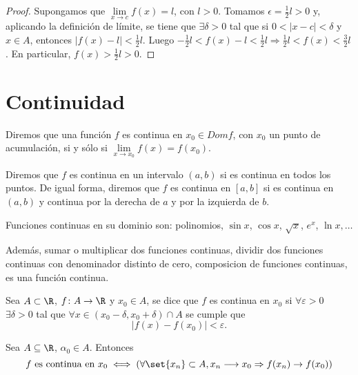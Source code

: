 \begin{proof}
	Supongamos que \(\lim\limits_{x  \to c } f(x) = l \), con \(l >0 \). Tomamos \(\epsilon = \frac{1}{2} l > 0 \) y, aplicando la definición de límite, se tiene que \(\exists \delta > 0 \) tal que si \(0 < \left\vert x - c  \right\vert < \delta\) y \(x \in A \), entonces \(\left\vert f(x) - l  \right\vert < \frac{1}{2} l\). Luego \(-\frac{1}{2}l < f(x) - l < \frac{1}{2} l \Rightarrow \frac{1}{2} l < f(x) < \frac{3}{2} l\). En particular, \(f(x) > \frac{1}{2} l > 0\).        
\end{proof}
\section{Continuidad}
\begin{definition}
	Diremos que una función \(f \) es continua en \(x_0 \in Domf\), con \(x_0 \) un punto de acumulación, si y sólo si \(\lim\limits_{x  \to x_0 } f(x)= f(x_0 )\).
	
	Diremos que \(f \) es continua en un intervalo \((a,b )\) si es continua en todos los puntos. De igual forma, diremos que \(f \) es continua en \([a,b ]\) si es continua en \((a,b )\) y continua por la derecha de \(a \) y por la izquierda de \(b \).
\end{definition}
\begin{example}
	Funciones continuas en su dominio son: polinomios, \(\sin x\), \(\cos x\), \(\sqrt{x }\), \(e^{x}\), \(\ln x, \ldots\)     
\end{example}
Además, sumar o multiplicar dos funciones continuas, dividir dos funciones continuas con denominador distinto de cero, composicion de funciones continuas, es una función continua.
\begin{definition}
	Sea \(A \subset \R \), \(f\colon A \to \R \) y \(x_0 \in A \), se dice que \(f \) es continua en \(x_0 \) si \(\forall \varepsilon > 0 \) \(\exists \delta > 0 \) tal que \(\forall x \in (x_0 - \delta, x_0 + \delta) \cap A\) se cumple que
	\[
		\left\vert f(x) - f(x_0 ) \right\vert < \varepsilon.
	\]
\end{definition}

\begin{theorem}
	Sea \(A \subseteq \R \), \(\alpha_0 \in A \). Entonces
	\[
		f \text{ es continua en } x_0 \iff (\forall \set{x_n} \subset A, x_n \longrightarrow x_0 \Rightarrow f(x_n) \rightarrow f(x_0))
	\]
\end{theorem}
